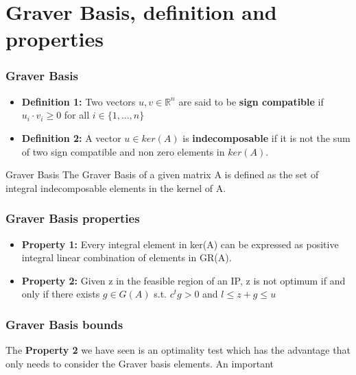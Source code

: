 \documentclass{beamer}
\begin{document}
    \section{Graver Basis, definition and properties}
    \begin{frame}
        \frametitle{Graver Basis}
        \begin{itemize}
            \item \textbf{Definition 1:} Two vectors $u,v \in \mathbb{R}^n$ are said to be \textbf{sign compatible} if $u_i \cdot v_i \geq 0$ for all $i \in \{1,...,n\}$
            \vspace{0.2cm}
            \item \textbf{Definition 2:} A vector $u \in ker(A)$ is \textbf{indecomposable} if it is not the sum of two sign compatible and non zero elements in $ker(A)$.
        \end{itemize}
        \vspace{1cm}
        \begin{block}{Graver Basis }
            The Graver Basis of a given matrix A is defined as the set of integral indecomposable elements in the kernel of A.
        \end{block}
    \end{frame}
    
    \begin{frame}
        \frametitle{Graver Basis properties}
        \begin{itemize}
            \item \textbf{Property 1:} Every integral element in ker(A) can be expressed as positive integral linear combination of elements in GR(A).
            \vspace{0.2cm}
            \item \textbf{Property 2:} Given z in the feasible region of an IP, z is not optimum if and only if there exists $g \in G(A)$ s.t. $c^tg > 0$ and $l \leq z + g \leq u$
        \end{itemize}
        
    \end{frame}
    
    \begin{frame}
        \frametitle{Graver Basis bounds}
        The \textbf{Property 2} we have seen is an optimality test which has the advantage that only needs to consider the Graver basis elements. An important 
    \end{frame}
    
\end{document}
